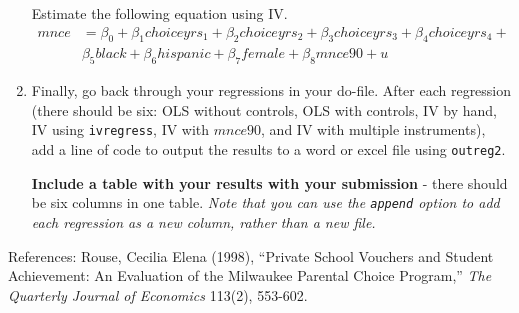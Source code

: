 \documentclass[11pt]{article}
\begin{document}
\begin{enumerate}
  Estimate the following equation using IV. \[\begin{split}
   mnce &= \beta_0 + \beta_1 choiceyrs_1 + \beta_2 choiceyrs_2 + \beta_3 choiceyrs_3 + \beta_4 choiceyrs_4 + \\
   &  \beta_5 black + \beta_6 hispanic + \beta_7 female + \beta_8 mnce90 + u
   \end{split}\]
\item
  Finally, go back through your regressions in your do-file. After each
  regression (there should be six: OLS without controls, OLS with
  controls, IV by hand, IV using \texttt{ivregress}, IV with \(mnce90\),
  and IV with multiple instruments), add a line of code to output the
  results to a word or excel file using \texttt{outreg2}.

  \textbf{Include a table with your results with your submission} -
  there should be six columns in one table. \emph{Note that you can use
  the \texttt{append} option to add each regression as a new column,
  rather than a new file.}
\end{enumerate}

References: Rouse, Cecilia Elena (1998), ``Private School Vouchers and
Student Achievement: An Evaluation of the Milwaukee Parental Choice
Program,'' \emph{The Quarterly Journal of Economics} 113(2), 553-602.
\end{document}
